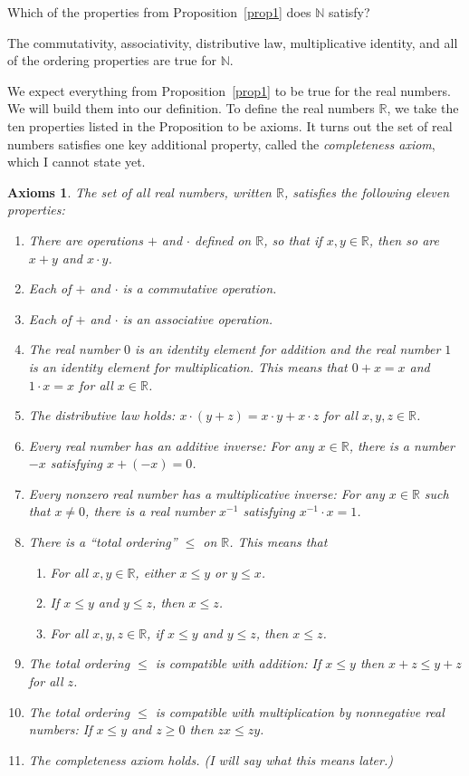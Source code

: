 \documentclass[12pt]{amsart}
\newcommand{\R}{{\mathbb{R}}}
\newcommand{\N}{\mathbb{N}}
\numberwithin{equation}{section}
\theoremstyle{plain} %
\newtheorem*{axioms*}{Axioms}
\theoremstyle{definition}
\theoremstyle{remark}
\begin{document}
Which of the properties from Proposition~\ref{prop1} does $\N$ satisfy?

The commutativity, associativity, distributive law, multiplicative identity, and all of the ordering properties are true for $\N$.


We expect everything from Proposition~\ref{prop1} to be true for the real numbers. We will build them into our definition.
To define the real numbers $\R$, we take the ten properties listed in the Proposition to be axioms. 
It turns out the set of real numbers satisfies one key additional
property, called the {\em completeness axiom}, which I cannot state yet. 


\begin{axioms*} The set of all real numbers, written $\R$, satisfies the following eleven properties:\index{$\R$}
\begin{enumerate}
\item[(Axiom 1)] There are operations $+$ and $\cdot$ defined on $\R$, so that if $x, y \in \R$, then so are $x + y$ and $x \cdot y$.
\item[(Axiom 2)]  Each of $+$ and $\cdot$ is a commutative operation. 
\item[(Axiom 3)]  Each of $+$ and $\cdot$ is an associative  operation.
\item[(Axiom 4)]  The real number $0$ is an identity element for addition and the real number $1$ is an identity element for multiplication. This means that
 $0 + x = x$ and $1 \cdot x = x$ for all $x \in \R$. 
\item[(Axiom 5)]  The distributive law holds: $x \cdot (y + z) = x \cdot y + x \cdot z$ for all $x,y,z \in \R$.
\item[(Axiom 6)]  Every real number has an additive inverse: For any $x \in \R$, there is a number $-x$ satisfying $x + (-x) = 0$.
\item[(Axiom 7)]  Every nonzero real number has a multiplicative inverse: For any $x \in \R$ such that $x \ne 0$, there is a real number $x^{-1}$ satisfying $x^{-1} \cdot x= 1$.
\item[(Axiom 8)]  There is a ``total ordering'' $\leq$ on $\R$. This means that 
\begin{enumerate}
\item For all $x, y \in \R$, either $x \leq y$ or $y \leq x$.
\item If $x \leq y$ and $y \leq z$, then $x \leq z$.
\item For all $x, y, z \in \R$, if $x \leq y$ and $y \leq z$, then $x \leq z$.
\end{enumerate}
\item[(Axiom 9)]  The total ordering $\leq$ is compatible with addition: If $x \leq y$ then $x + z \leq y + z$ for all $z$.
\item[(Axiom 10)]  The total ordering $\leq$ is compatible with multiplication by nonnegative real numbers: If $x \leq y$ and $z \geq 0$ then $zx \leq zy$.
\item[(Axiom 11)]  The completeness axiom holds. (I will say what this means later.) 
\end{enumerate}
\end{axioms*}
\end{document}
